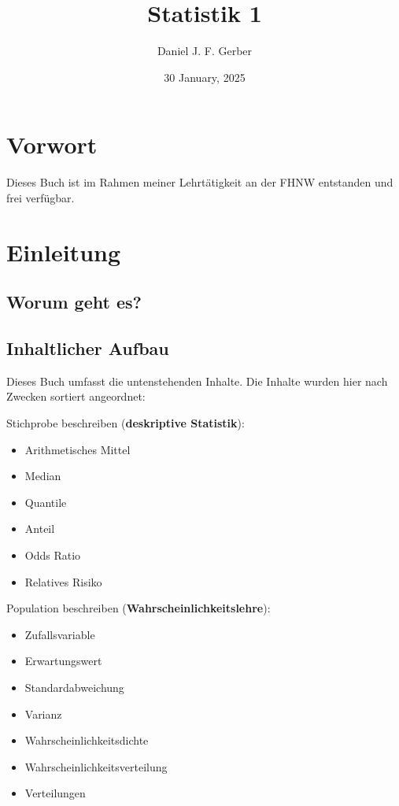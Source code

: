 \documentclass[
]{book}
\title{Statistik 1}
\author{Daniel J. F. Gerber}
\date{30 January, 2025}
\providecommand{\tightlist}{%
  \setlength{\itemsep}{0pt}\setlength{\parskip}{0pt}}
\theoremstyle{definition}
\theoremstyle{definition}
\theoremstyle{definition}
\theoremstyle{definition}
\theoremstyle{remark}
\begin{document}
\maketitle

{
\setcounter{tocdepth}{1}
\tableofcontents
}
\chapter*{Vorwort}\label{vorwort}

Dieses Buch ist im Rahmen meiner Lehrtätigkeit an der FHNW entstanden und frei verfügbar.

\chapter{Einleitung}\label{einleitung}

\section{Worum geht es?}\label{worum-geht-es}

\section{Inhaltlicher Aufbau}\label{inhaltlicher-aufbau}

Dieses Buch umfasst die untenstehenden Inhalte. Die Inhalte wurden hier nach Zwecken sortiert angeordnet:

Stichprobe beschreiben (\textbf{deskriptive Statistik}):

\begin{itemize}
\tightlist
\item
  Arithmetisches Mittel
\item
  Median
\item
  Quantile
\item
  Anteil
\item
  Odds Ratio
\item
  Relatives Risiko
\end{itemize}

Population beschreiben (\textbf{Wahrscheinlichkeitslehre}):

\begin{itemize}
\tightlist
\item
  Zufallsvariable
\item
  Erwartungswert
\item
  Standardabweichung
\item
  Varianz
\item
  Wahrscheinlichkeitsdichte
\item
  Wahrscheinlichkeitsverteilung
\item
  Verteilungen
\end{itemize}
\end{document}
